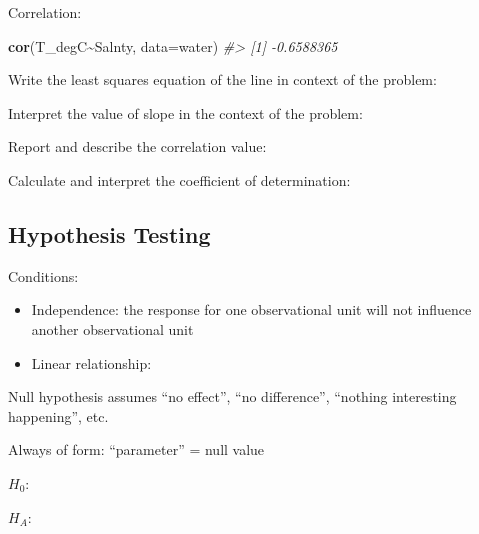 \documentclass[
]{report}
\newenvironment{Shaded}{\begin{snugshade}}{\end{snugshade}}
\newcommand{\AttributeTok}[1]{\textcolor[rgb]{0.13,0.29,0.53}{#1}}
\newcommand{\CommentTok}[1]{\textcolor[rgb]{0.56,0.35,0.01}{\textit{#1}}}
\newcommand{\FunctionTok}[1]{\textcolor[rgb]{0.13,0.29,0.53}{\textbf{#1}}}
\newcommand{\NormalTok}[1]{#1}
\newcommand{\SpecialCharTok}[1]{\textcolor[rgb]{0.81,0.36,0.00}{\textbf{#1}}}
\newcommand{\rgi}{\hspace{24pt}}  %
\begin{document}
Correlation:

\begin{Shaded}
\begin{Highlighting}[]
\FunctionTok{cor}\NormalTok{(T\_degC}\SpecialCharTok{\textasciitilde{}}\NormalTok{Salnty, }\AttributeTok{data=}\NormalTok{water)}
\CommentTok{\#\textgreater{} [1] {-}0.6588365}
\end{Highlighting}
\end{Shaded}

Write the least squares equation of the line in context of the problem:

\vspace{0.5in}

Interpret the value of slope in the context of the problem:

\vspace{0.5in}

Report and describe the correlation value:

\vspace{0.5in}

Calculate and interpret the coefficient of determination:

\vspace{0.8in}

\hypertarget{hypothesis-testing-5}{%
\subsection*{Hypothesis Testing}\label{hypothesis-testing-5}}

Conditions:

\begin{itemize}
\item
  Independence: the response for one observational unit will not influence another observational unit
\item
  Linear relationship:
\end{itemize}

\vspace{0.3in}

Null hypothesis assumes ``no effect'', ``no difference'', ``nothing interesting happening'', etc.

\rgi Always of form: ``parameter'' = null value

\(H_0:\)

\vspace{0.5in}

\(H_A:\)

\vspace{0.5in}
\end{document}
